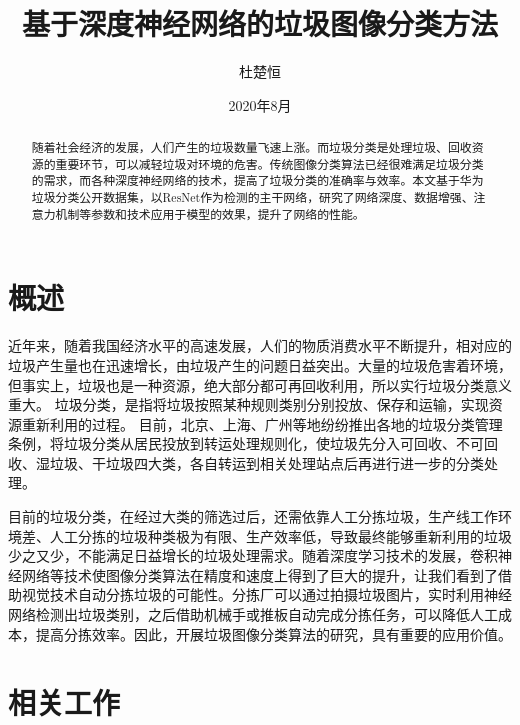 \documentclass[a4paper]{article}
\title{基于深度神经网络的垃圾图像分类方法}
\author{杜楚恒}
\date{2020年8月}
\begin{document}
\begin{CJK*}{UTF8}{gbsn}

\maketitle

\renewcommand{\abstractname}{摘要}
\begin{abstract}
    随着社会经济的发展，人们产生的垃圾数量飞速上涨。而垃圾分类是处理垃圾、回收资源的重要环节，可以减轻垃圾对环境的危害。传统图像分类算法已经很难满足垃圾分类的需求，而各种深度神经网络的技术，提高了垃圾分类的准确率与效率。本文基于华为垃圾分类公开数据集，以ResNet作为检测的主干网络，研究了网络深度、数据增强、注意力机制等参数和技术应用于模型的效果，提升了网络的性能。
\end{abstract}

\section{概述}

近年来，随着我国经济水平的高速发展，人们的物质消费水平不断提升，相对应的垃圾产生量也在迅速增长，由垃圾产生的问题日益突出。大量的垃圾危害着环境，但事实上，垃圾也是一种资源，绝大部分都可再回收利用，所以实行垃圾分类意义重大。
垃圾分类，是指将垃圾按照某种规则类别分别投放、保存和运输，实现资源重新利用的过程。
目前，北京、上海、广州等地纷纷推出各地的垃圾分类管理条例，将垃圾分类从居民投放到转运处理规则化，使垃圾先分入可回收、不可回收、湿垃圾、干垃圾四大类，各自转运到相关处理站点后再进行进一步的分类处理。


目前的垃圾分类，在经过大类的筛选过后，还需依靠人工分拣垃圾，生产线工作环境差、人工分拣的垃圾种类极为有限、生产效率低，导致最终能够重新利用的垃圾少之又少，不能满足日益增长的垃圾处理需求。随着深度学习技术的发展，卷积神经网络等技术使图像分类算法在精度和速度上得到了巨大的提升，让我们看到了借助视觉技术自动分拣垃圾的可能性。分拣厂可以通过拍摄垃圾图片，实时利用神经网络检测出垃圾类别，之后借助机械手或推板自动完成分拣任务，可以降低人工成本，提高分拣效率。因此，开展垃圾图像分类算法的研究，具有重要的应用价值。


\section{相关工作}


\end{CJK*}
\end{document}
